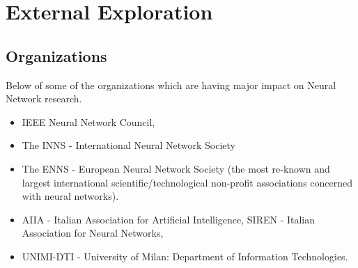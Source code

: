 \chapter{External Exploration}


\section{Organizations}
Below of some of the organizations which are having major impact on Neural Network research.

\begin{itemize}
\item IEEE Neural Network Council, 
\item The INNS - International Neural Network Society
\item The ENNS - European Neural Network Society
(the most re-known and largest international scientific/technological non-profit associations
concerned with neural networks).
\item AIIA - Italian Association for Artificial Intelligence, SIREN - Italian Association for Neural Networks,
\item UNIMI-DTI - University of Milan: Department of Information Technologies.
\end{itemize}

